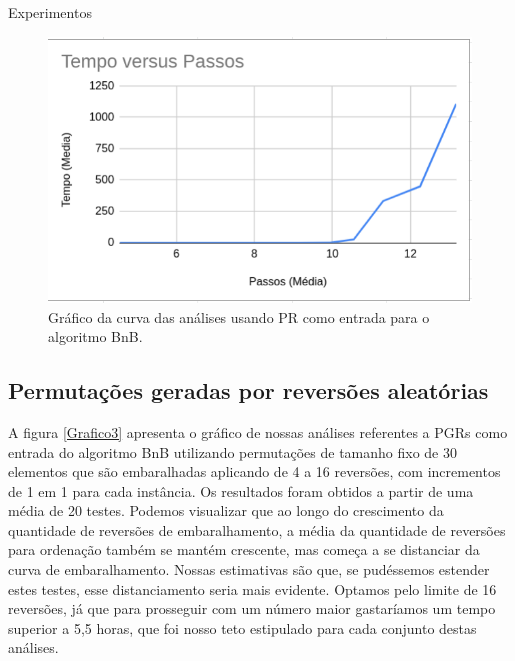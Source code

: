 \begin{chapter}{Experimentos}
\begin{figure}[H]
  \centering
  \begin{minipage}[b]{0.5\textwidth}
    \includegraphics[width=\textwidth]{Imagens/Analises/B_PR2.png}
    \caption{\label{Grafico2}Gráfico da curva das análises usando PR como entrada para o algoritmo BnB.}
  \end{minipage}
\end{figure}

\subsection{Permutações geradas por reversões aleatórias}

A figura \ref{Grafico3} apresenta o gráfico de nossas análises referentes a PGRs como entrada do algoritmo BnB utilizando permutações de tamanho fixo de 30 elementos que são embaralhadas aplicando de 4 a 16 reversões, com incrementos de 1 em 1 para cada instância. Os resultados foram obtidos a partir de uma média de 20 testes. Podemos visualizar que ao longo do crescimento da quantidade de reversões de embaralhamento, a média da quantidade de reversões para ordenação também se mantém crescente, mas começa a se distanciar da curva de embaralhamento. Nossas estimativas são que, se pudéssemos estender estes testes, esse distanciamento seria mais evidente. Optamos pelo limite de 16 reversões, já que para prosseguir com um número maior gastaríamos um tempo superior a 5,5 horas, que foi nosso teto estipulado para cada conjunto destas análises.


\end{chapter}
